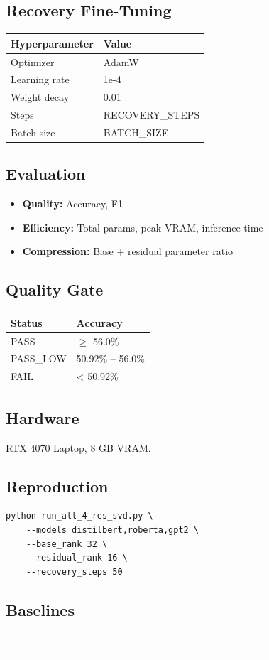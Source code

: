 \subsection{Recovery Fine-Tuning}

\begin{table}[H]
\centering
\small
\begin{tabular}{ll}
\toprule
\textbf{Hyperparameter} & \textbf{Value} \\
\midrule
Optimizer & AdamW \\
Learning rate & 1e-4 \\
Weight decay & 0.01 \\
Steps & {{RECOVERY\_STEPS}} \\
Batch size & {{BATCH\_SIZE}} \\
\bottomrule
\end{tabular}
\end{table}

\subsection{Evaluation}

\begin{itemize}
\item \textbf{Quality:} Accuracy, F1
\item \textbf{Efficiency:} Total params, peak VRAM, inference time
\item \textbf{Compression:} Base + residual parameter ratio

\end{itemize}
\subsection{Quality Gate}

\begin{table}[H]
\centering
\small
\begin{tabular}{ll}
\toprule
\textbf{Status} & \textbf{Accuracy} \\
\midrule
PASS & $\ge$ 56.0\% \\
PASS\_LOW & 50.92\% -- 56.0\% \\
FAIL & < 50.92\% \\
\bottomrule
\end{tabular}
\end{table}

\subsection{Hardware}

RTX 4070 Laptop, 8 GB VRAM.

\subsection{Reproduction}

\begin{lstlisting}
python run_all_4_res_svd.py \
    --models distilbert,roberta,gpt2 \
    --base_rank 32 \
    --residual_rank 16 \
    --recovery_steps 50
\end{lstlisting}

\subsection{Baselines}

\begin{lstlisting}

---
\end{lstlisting}